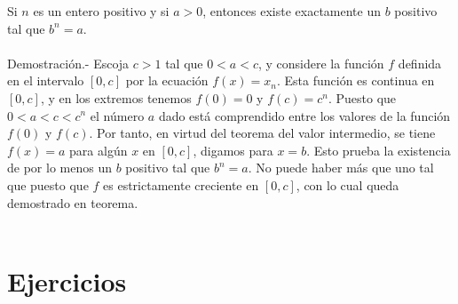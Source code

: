 \begin{teo}
    Si $n$ es un entero positivo y si $a>0$, entonces existe exactamente un $b$ positivo tal que $b^n=a.$\\\\
	Demostración.-\; Escoja $c>1$ tal que $0<a<c$, y considere la función $f$ definida en el intervalo $[0,c]$ por la ecuación $f(x)=x_n$. Esta función es continua en $[0,c]$, y en los extremos tenemos $f(0)=0$ y $f(c)=c^n$. Puesto que $0<a<c<c^n$ el número $a$ dado está comprendido entre los valores de la función $f(0)$ y $f(c)$. Por tanto, en virtud del teorema del valor intermedio, se tiene $f(x)=a$ para algún $x$ en $[0,c]$, digamos para $x=b$. Esto prueba la existencia de por lo menos un $b$ positivo tal que $b^n=a.$ No puede haber más que uno tal que puesto que $f$ es estrictamente creciente en $[0,c]$, con lo cual queda demostrado en teorema.\\\\
\end{teo}

\section{Ejercicios}

